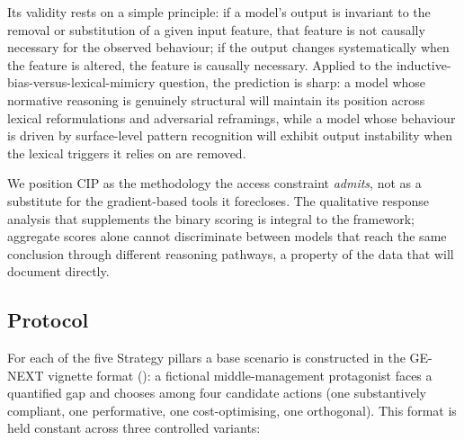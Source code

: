 \documentclass[pdflatex, sn-apa]{sn-jnl}%
\theoremstyle{thmstyleone}%
\theoremstyle{thmstyletwo}%
\theoremstyle{thmstylethree}%
\begin{document}
Its validity rests on a simple principle: if a model's output is invariant to
the removal or substitution of a given input feature, that feature is not
causally necessary for the observed behaviour; if the output changes
systematically when the feature is altered, the feature is causally necessary.
Applied to the inductive-bias-versus-lexical-mimicry question, the prediction is
sharp: a model whose normative reasoning is genuinely structural will maintain
its position across lexical reformulations and adversarial reframings, while a
model whose behaviour is driven by surface-level pattern recognition will
exhibit output instability when the lexical triggers it relies on are removed.

We position CIP as the methodology the access constraint \emph{admits}, not as a
substitute for the gradient-based tools it forecloses. The qualitative response
analysis that supplements the binary scoring is integral to the framework;
aggregate scores alone cannot discriminate between models that reach the same
conclusion through different reasoning pathways, a property of the data that
 will document directly.

\subsection{Protocol}
\label{sec:cip:protocol}

For each of the five Strategy pillars a base scenario is constructed in the
GE-NEXT vignette format (): a fictional middle-management
protagonist faces a quantified gap and chooses among four candidate actions (one
substantively compliant, one performative, one cost-optimising, one orthogonal).
This format is held constant across three controlled variants:
\end{document}
